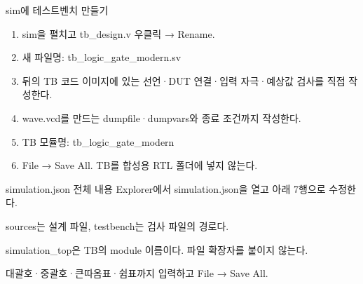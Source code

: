 \begin{frame}{sim에 테스트벤치 만들기}\relax
\small
\begin{enumerate}\setlength{\itemsep}{0.22cm}
\item sim을 펼치고 tb\_design.v 우클릭 → Rename.
\item 새 파일명: tb\_logic\_gate\_modern.sv
\item 뒤의 TB 코드 이미지에 있는 선언·DUT 연결·입력 자극·예상값 검사를 직접 작성한다.
\item wave.vcd를 만드는 dumpfile·dumpvars와 종료 조건까지 작성한다.
\item TB 모듈명: tb\_logic\_gate\_modern
\item File → Save All. TB를 합성용 RTL 폴더에 넣지 않는다.
\end{enumerate}

\end{frame}

\begin{frame}{simulation.json 전체 내용}\relax
\small
Explorer에서 simulation.json을 열고 아래 7행으로 수정한다.\par{}sources는 설계 파일, testbench는 검사 파일의 경로다.\par\vspace{0.22cm}simulation\_top은 TB의 module 이름이다. 파일 확장자를 붙이지 않는다.\par\vspace{0.22cm}대괄호·중괄호·큰따옴표·쉼표까지 입력하고 File → Save All.\par
\end{frame}
